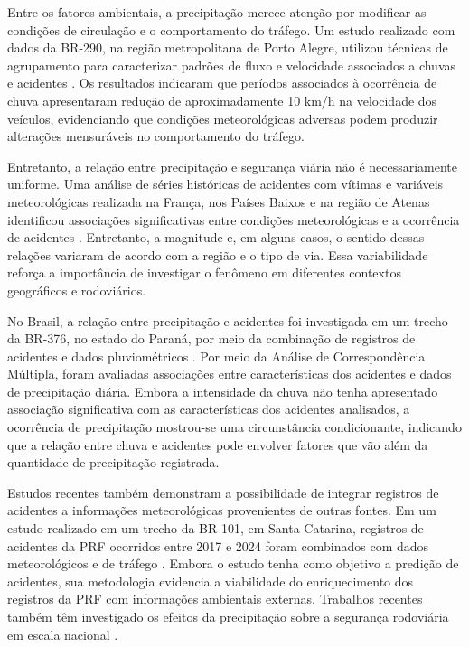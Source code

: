 \documentclass[12pt]{article}
\begin{document}
Entre os fatores ambientais, a precipitação merece atenção por modificar as condições de circulação e o comportamento do tráfego. Um estudo realizado com dados da BR-290, na região metropolitana de Porto Alegre, utilizou técnicas de agrupamento para caracterizar padrões de fluxo e velocidade associados a chuvas e acidentes \cite{caleffi2016}. Os resultados indicaram que períodos associados à ocorrência de chuva apresentaram redução de aproximadamente 10 km/h na velocidade dos veículos, evidenciando que condições meteorológicas adversas podem produzir alterações mensuráveis no comportamento do tráfego.

Entretanto, a relação entre precipitação e segurança viária não é necessariamente uniforme. Uma análise de séries históricas de acidentes com vítimas e variáveis meteorológicas realizada na França, nos Países Baixos e na região de Atenas identificou associações significativas entre condições meteorológicas e a ocorrência de acidentes \cite{bergel2013}. Entretanto, a magnitude e, em alguns casos, o sentido dessas relações variaram de acordo com a região e o tipo de via. Essa variabilidade reforça a importância de investigar o fenômeno em diferentes contextos geográficos e rodoviários.

No Brasil, a relação entre precipitação e acidentes foi investigada em um trecho da BR-376, no estado do Paraná, por meio da combinação de registros de acidentes e dados pluviométricos \cite{silva2020}. Por meio da Análise de Correspondência Múltipla, foram avaliadas associações entre características dos acidentes e dados de precipitação diária. Embora a intensidade da chuva não tenha apresentado associação significativa com as características dos acidentes analisados, a ocorrência de precipitação mostrou-se uma circunstância condicionante, indicando que a relação entre chuva e acidentes pode envolver fatores que vão além da quantidade de precipitação registrada.

Estudos recentes também demonstram a possibilidade de integrar registros de acidentes a informações meteorológicas provenientes de outras fontes. Em um estudo realizado em um trecho da BR-101, em Santa Catarina, registros de acidentes da PRF ocorridos entre 2017 e 2024 foram combinados com dados meteorológicos e de tráfego \cite{fuhr2026}. Embora o estudo tenha como objetivo a predição de acidentes, sua metodologia evidencia a viabilidade do enriquecimento dos registros da PRF com informações ambientais externas. Trabalhos recentes também têm investigado os efeitos da precipitação sobre a segurança rodoviária em escala nacional \cite{brasileiro2026}.
\end{document}
